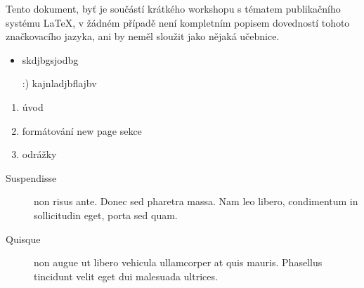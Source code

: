 \documentclass{article}
\begin{document}
Tento dokument, byť je součástí krátkého workshopu s tématem publikačního systému \LaTeX, v žádném případě není kompletním popisem dovedností tohoto značkovacího jazyka, ani by neměl sloužit jako nějaká učebnice.

\begin{itemize}
	\item skdjbgsjodbg
	\item[:)] kajnladjbflajbv 
\end{itemize}

\begin{enumerate}
	\item úvod
	\item formátování
		\subitem new page
		\subitem sekce
	\item odrážky
\end{enumerate}

\begin{description}
	\item[Suspendisse] non risus ante. Donec sed pharetra massa. Nam leo libero, condimentum in sollicitudin eget, porta sed quam.
	\item[Quisque] non augue ut libero vehicula ullamcorper at quis mauris. Phasellus tincidunt velit eget dui malesuada ultrices.
\end{description}
\end{document}

